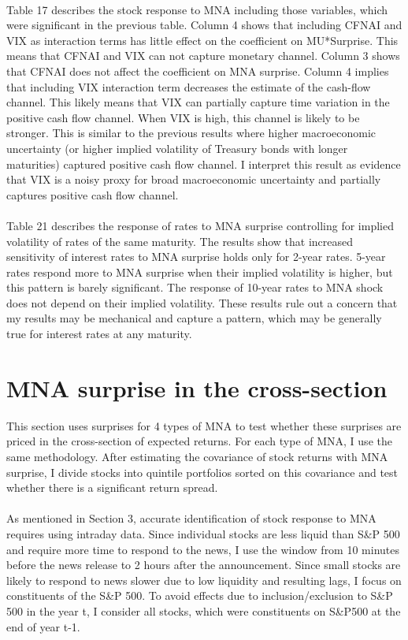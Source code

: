 \documentclass[12pt]{article}
\begin{document}
\paragraph{}
Table 17 describes the stock response to MNA including those variables, which were significant in the previous table. Column 4 shows that including CFNAI and VIX as interaction terms has little effect on the coefficient on MU*Surprise. This means that CFNAI and VIX can not capture monetary channel. Column 3 shows that CFNAI does not affect the coefficient on MNA surprise. Column 4 implies that including VIX interaction term decreases the estimate of the cash-flow channel. This likely means that VIX can partially capture time variation in the positive cash flow channel. When VIX is high, this channel is likely to be stronger. This is similar to the previous results where higher macroeconomic uncertainty (or higher implied volatility of Treasury bonds with longer maturities) captured positive cash flow channel. I interpret this result as evidence that VIX is a noisy proxy for broad macroeconomic uncertainty and partially captures positive cash flow channel.
\paragraph{}
Table 21 describes the response of rates to MNA surprise controlling for implied volatility of rates of the same maturity. The results show that increased sensitivity of interest rates to MNA surprise holds only for 2-year rates. 5-year rates respond more to MNA surprise when their implied volatility is higher, but this pattern is barely significant. The response of 10-year rates to MNA shock does not depend on their implied volatility. These results rule out a concern that my results may be mechanical and capture a pattern, which may be generally true for interest rates at any maturity.

\section{MNA surprise in the cross-section} \label{sec:Model}

This section uses surprises for 4 types of MNA to test whether these surprises are priced in the cross-section of expected returns. For each type of MNA, I use the same methodology. After estimating the covariance of stock returns with MNA surprise, I divide stocks into quintile portfolios sorted on this covariance and test whether there is a significant return spread.
\paragraph{}
As mentioned in Section 3, accurate identification of stock response to MNA requires using intraday data. Since individual stocks are less liquid than S\&P 500 and require more time to respond to the news, I use the window from 10 minutes before the news release to 2 hours after the announcement. Since small stocks are likely to respond to news slower due to low liquidity and resulting lags, I focus on constituents of the S\&P 500. To avoid effects due to inclusion/exclusion to S\&P 500 in the year t, I consider all stocks, which were constituents on S\&P500 at the end of year t-1.
\end{document}

